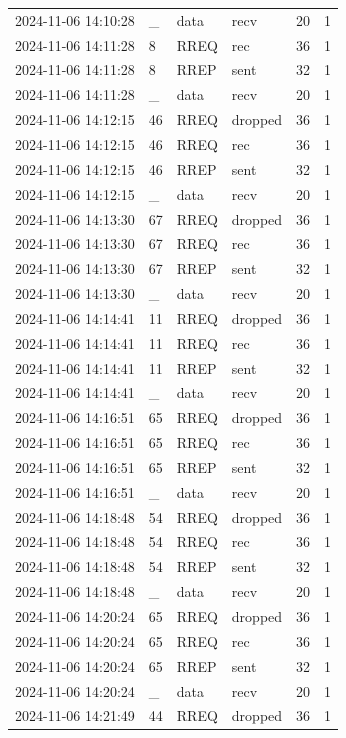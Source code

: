 \documentclass[]{nsm-thesis}
\begin{document}
\begin{longtable}{llllll}
2024-11-06 14:10:28 & _ & data & recv & 20 & 1 \\
2024-11-06 14:11:28 & 8 & RREQ & rec & 36 & 1 \\
2024-11-06 14:11:28 & 8 & RREP & sent & 32 & 1 \\
2024-11-06 14:11:28 & _ & data & recv & 20 & 1 \\
2024-11-06 14:12:15 & 46 & RREQ & dropped & 36 & 1 \\
2024-11-06 14:12:15 & 46 & RREQ & rec & 36 & 1 \\
2024-11-06 14:12:15 & 46 & RREP & sent & 32 & 1 \\
2024-11-06 14:12:15 & _ & data & recv & 20 & 1 \\
2024-11-06 14:13:30 & 67 & RREQ & dropped & 36 & 1 \\
2024-11-06 14:13:30 & 67 & RREQ & rec & 36 & 1 \\
2024-11-06 14:13:30 & 67 & RREP & sent & 32 & 1 \\
2024-11-06 14:13:30 & _ & data & recv & 20 & 1 \\
2024-11-06 14:14:41 & 11 & RREQ & dropped & 36 & 1 \\
2024-11-06 14:14:41 & 11 & RREQ & rec & 36 & 1 \\
2024-11-06 14:14:41 & 11 & RREP & sent & 32 & 1 \\
2024-11-06 14:14:41 & _ & data & recv & 20 & 1 \\
2024-11-06 14:16:51 & 65 & RREQ & dropped & 36 & 1 \\
2024-11-06 14:16:51 & 65 & RREQ & rec & 36 & 1 \\
2024-11-06 14:16:51 & 65 & RREP & sent & 32 & 1 \\
2024-11-06 14:16:51 & _ & data & recv & 20 & 1 \\
2024-11-06 14:18:48 & 54 & RREQ & dropped & 36 & 1 \\
2024-11-06 14:18:48 & 54 & RREQ & rec & 36 & 1 \\
2024-11-06 14:18:48 & 54 & RREP & sent & 32 & 1 \\
2024-11-06 14:18:48 & _ & data & recv & 20 & 1 \\
2024-11-06 14:20:24 & 65 & RREQ & dropped & 36 & 1 \\
2024-11-06 14:20:24 & 65 & RREQ & rec & 36 & 1 \\
2024-11-06 14:20:24 & 65 & RREP & sent & 32 & 1 \\
2024-11-06 14:20:24 & _ & data & recv & 20 & 1 \\
2024-11-06 14:21:49 & 44 & RREQ & dropped & 36 & 1 \\

\end{longtable}
\end{document}

